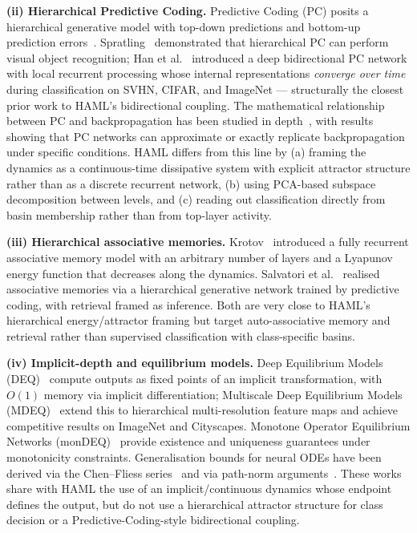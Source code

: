 \documentclass[11pt,a4paper]{article}
\begin{document}
\textbf{(ii) Hierarchical Predictive Coding.} Predictive Coding (PC) posits a
hierarchical generative model with top-down predictions and bottom-up prediction
errors~\cite{rao1999predictive,friston2005theory}.
Spratling~\cite{spratling2017hierarchical} demonstrated that hierarchical PC can perform
visual object recognition; Han et al.~\cite{han2018deep} introduced a deep bidirectional
PC network with local recurrent processing whose internal representations \emph{converge
over time} during classification on SVHN, CIFAR, and ImageNet --- structurally the
closest prior work to HAML's bidirectional coupling. The mathematical relationship
between PC and backpropagation has been studied in
depth~\cite{whittington2017approximation,song2020can,salvatori2021exactbp}, with
results showing that PC networks can approximate or exactly replicate backpropagation
under specific conditions. HAML differs from this line by (a) framing the dynamics as a
continuous-time dissipative system with explicit attractor structure rather than as a
discrete recurrent network, (b) using PCA-based subspace decomposition between levels,
and (c) reading out classification directly from basin membership rather than from
top-layer activity.

\textbf{(iii) Hierarchical associative memories.} Krotov~\cite{krotov2021hierarchical}
introduced a fully recurrent associative memory model with an arbitrary number of layers
and a Lyapunov energy function that decreases along the dynamics. Salvatori et
al.~\cite{salvatori2021associative} realised associative memories via a hierarchical
generative network trained by predictive coding, with retrieval framed as inference.
Both are very close to HAML's hierarchical energy/attractor framing but target
auto-associative memory and retrieval rather than supervised classification with
class-specific basins.

\textbf{(iv) Implicit-depth and equilibrium models.} Deep Equilibrium Models
(DEQ)~\cite{bai2019deep} compute outputs as fixed points of an implicit
transformation, with $O(1)$ memory via implicit differentiation; Multiscale Deep
Equilibrium Models (MDEQ)~\cite{bai2020multiscale} extend this to hierarchical
multi-resolution feature maps and achieve competitive results on ImageNet and
Cityscapes. Monotone Operator Equilibrium Networks
(monDEQ)~\cite{winston2020monotone} provide existence and uniqueness guarantees under
monotonicity constraints. Generalisation bounds for neural ODEs have been derived via
the Chen--Fliess series~\cite{hanson2024rademacher} and via path-norm
arguments~\cite{marion2023generalization}. These works share with HAML the use of an
implicit/continuous dynamics whose endpoint defines the output, but do not use a
hierarchical attractor structure for class decision or a Predictive-Coding-style
bidirectional coupling.
\end{document}
